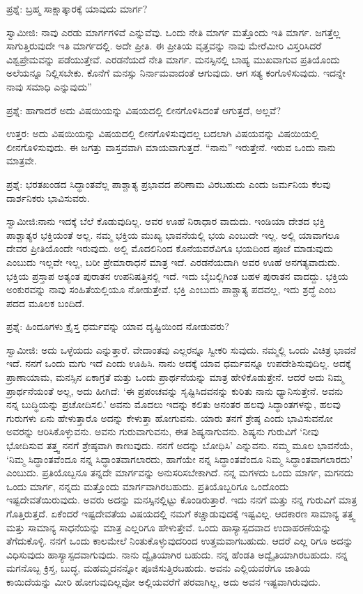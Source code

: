 ಪ್ರಶ್ನೆ: ಬ್ರಹ್ಮ ಸಾಕ್ಷಾತ್ಕಾರಕ್ಕೆ ಯಾವುದು ಮಾರ್ಗ?

ಸ್ವಾಮೀಜಿ: ನಾವು ಎರಡು ಮಾರ್ಗಗಳಿವೆ ಎನ್ನುವೆವು. ಒಂದು ನೇತಿ ಮಾರ್ಗ ಮತ್ತೊಂದು ಇತಿ ಮಾರ್ಗ. ಜಗತ್ತೆಲ್ಲ ಸಾಗುತ್ತಿರುವುದೇ ಇತಿ ಮಾರ್ಗದಲ್ಲಿ. ಅದೇ ಪ್ರೀತಿ. ಈ ಪ್ರೀತಿಯ ವೃತ್ತವನ್ನು ನಾವು ಮೇರೆಮೀರಿ ವಿಸ್ತರಿಸಿದರೆ ವಿಶ್ವಪ್ರೇಮವನ್ನು ಪಡೆಯುತ್ತೇವೆ. ಎರಡನೆಯದೆ ನೇತಿ ಮಾರ್ಗ. ಮನಸ್ಸಿನಲ್ಲಿ ಬಾಹ್ಯ ಮುಖವಾಗುವ ಪ್ರತಿಯೊಂದು ಅಲೆಯನ್ನೂ ನಿಲ್ಲಿಸಬೇಕು. ಕೊನೆಗೆ ಮನಸ್ಸು ನಿರ್ನಾಮವಾದಂತೆ ಆಗುವುದು. ಆಗ ಸತ್ಯ ಕಂಗೊಳಿಸುವುದು. ಇದನ್ನೇ ನಾವು ಸಮಾಧಿ ಎನ್ನುವುದು”

ಪ್ರಶ್ನೆ: ಹಾಗಾದರೆ ಅದು ವಿಷಯಿಯನ್ನು ವಿಷಯದಲ್ಲಿ ಲೀನಗೊಳಿಸಿದಂತೆ ಆಗುತ್ತದೆ, ಅಲ್ಲವೆ?

ಉತ್ತರ: ಅದು ವಿಷಯಿಯನ್ನು ವಿಷಯದಲ್ಲಿ ಲೀನಗೊಳಿಸುವುದಲ್ಲ ಬದಲಾಗಿ ವಿಷಯವನ್ನು ವಿಷಯಿಯಲ್ಲಿ ಲೀನಗೊಳಿಸುವುದು. ಈ ಜಗತ್ತು ವಾಸ್ತವವಾಗಿ ಮಾಯವಾಗುತ್ತದೆ. “ನಾನು” ಇರುತ್ತೇನೆ. ಇರುವ ಒಂದು ನಾನು ಮಾತ್ರವೇ.

ಪ್ರಶ್ನೆ: ಭರತಖಂಡದ ಸಿದ್ಧಾಂತವೆಲ್ಲ ಪಾಶ್ಚಾತ್ಯ ಪ್ರಭಾವದ ಪರಿಣಾಮ ವಿರಬಹುದು ಎಂದು ಜರ್ಮನಿಯ ಕೆಲವು ದಾರ್ಶನಿಕರು ಭಾವಿಸುವರು.

ಸ್ವಾಮೀಜಿ:ನಾನು ಇದಕ್ಕೆ ಬೆಲೆ ಕೊಡುವುದಿಲ್ಲ. ಅವರ ಊಹೆ ನಿರಾಧಾರ ವಾದುದು. ಇಂಡಿಯಾ ದೇಶದ ಭಕ್ತಿ ಪಾಶ್ಚಾತ್ಯರ ಭಕ್ತಿಯಂತೆ ಅಲ್ಲ. ನಮ್ಮ ಭಕ್ತಿಯ ಮುಖ್ಯ ಭಾವನೆಯಲ್ಲಿ ಭಯ ಎಂಬುದೇ ಇಲ್ಲ. ಅಲ್ಲಿ ಯಾವಾಗಲೂ ದೇವರ ಪ್ರೀತಿಯೊಂದೇ ಇರುವುದು. ಅಲ್ಲಿ ಮೊದಲಿನಿಂದ ಕೊನೆಯವರೆವಿಗೂ ಭಯದಿಂದ ಪೂಜೆ ಮಾಡುವುದು ಎಂಬುದು ಇಲ್ಲವೇ ಇಲ್ಲ, ಬರೀ ಪ್ರೇಮಾರಾಧನೆ ಮಾತ್ರ ಇದೆ. ಎರಡನೆಯದಾಗಿ ಅವರ ಊಹೆ ಅನಗತ್ಯವಾದುದು. ಭಕ್ತಿಯ ಪ್ರಸ್ತಾಪ ಅತ್ಯಂತ ಪುರಾತನ ಉಪನಿಷತ್ತಿನಲ್ಲಿ ಇದೆ. ಇದು ಬೈಬಲ್ಲಿಗಿಂತ ಬಹಳ ಪುರಾತನ ವಾದದ್ದು. ಭಕ್ತಿಯ ಅಂಕುರವನ್ನು ನಾವು ಸಂಹಿತೆಯಲ್ಲಿಯೂ ನೋಡುತ್ತೇವೆ. ಭಕ್ತಿ ಎಂಬುದು ಪಾಶ್ಚಾತ್ಯ ಪದವಲ್ಲ, ಇದು ಶ್ರದ್ಧೆ ಎಂಬ ಪದದ ಮೂಲಕ ಬಂದಿದೆ.

ಪ್ರಶ್ನೆ: ಹಿಂದೂಗಳು ಕ್ರೈಸ್ತ ಧರ್ಮವನ್ನು ಯಾವ ದೃಷ್ಟಿಯಿಂದ ನೋಡುವರು?

ಸ್ವಾಮೀಜಿ: ಅದು ಒಳ್ಳೆಯದು ಎನ್ನುತ್ತಾರೆ. ವೇದಾಂತವು ಎಲ್ಲರನ್ನೂ ಸ್ವೀಕರಿ ಸುವುದು. ನಮ್ಮಲ್ಲಿ ಒಂದು ವಿಚಿತ್ರ ಭಾವನೆ ಇದೆ. ನನಗೆ ಒಂದು ಮಗು ಇದೆ ಎಂದು ಊಹಿಸಿ. ನಾನು ಅದಕ್ಕೆ ಯಾವ ಧರ್ಮವನ್ನೂ ಉಪದೇಶಿಸುವುದಿಲ್ಲ. ಅದಕ್ಕೆ ಪ್ರಾಣಾಯಾಮ, ಮನಸ್ಸಿನ ಏಕಾಗ್ರತೆ ಮತ್ತು ಒಂದು ಪ್ರಾರ್ಥನೆಯನ್ನು ಮಾತ್ರ ಹೇಳಿಕೊಡುತ್ತೇನೆ. ಆದರೆ ಅದು ನಿಮ್ಮ ಪ್ರಾರ್ಥನೆಯಂತೆ ಅಲ್ಲ, ಅದು ಹೀಗಿದೆ: ‘ಈ ಪ್ರಪಂಚವನ್ನು ಸೃಷ್ಟಿಸಿದವನನ್ನು ಕುರಿತು ನಾನು ಧ್ಯಾನಿಸುತ್ತೇನೆ. ಅವನು ನನ್ನ ಬುದ್ಧಿಯನ್ನು ಪ್ರಚೋದಿಸಲಿ.’ ಅವನು ಮೊದಲು ಇದನ್ನು ಕಲಿತು ಅನಂತರ ಹಲವು ಸಿದ್ಧಾಂತಗಳನ್ನು, ಹಲವು ಗುರುಗಳು ಏನು ಹೇಳುತ್ತಾರೊ ಅದನ್ನು ಕೇಳುತ್ತಾ ಹೋಗುವನು. ಯಾರು ತನಗೆ ಶ್ರೇಷ್ಠ ಎಂದು ಭಾವಿಸುವನೋ ಅವರನ್ನು ಆರಿಸಿಕೊಳ್ಳುವನು. ಅವನು ಗುರುವಾಗುವನು, ಈತ ಶಿಷ್ಯನಾಗುವನು. ಶಿಷ್ಯನು ಗುರುವಿಗೆ ‘ನೀವು ಭೋದಿಸುವ ತತ್ತ್ವ ನನಗೆ ಶ್ರೇಷ್ಠವಾಗಿ ಕಾಣುವುದು. ನನಗೆ ಅದನ್ನು ಬೋಧಿಸಿ’ ಎನ್ನುವನು. ನಮ್ಮ ಮೂಲ ಭಾವನೆಯೆ, ‘ನಿಮ್ಮ ಸಿದ್ಧಾಂತವೆಂದೂ ನನ್ನ ಸಿದ್ಧಾಂತವಾಗಲಾರದು, ಹಾಗೆಯೇ ನನ್ನ ಸಿದ್ಧಾಂತವೆಂದೂ ನಿಮ್ಮ ಸಿದ್ಧಾಂತವಾಗಲಾರದು’ ಎಂಬುದು. ಪ್ರತಿಯೊಬ್ಬನೂ ತನ್ನದೇ ಮಾರ್ಗವನ್ನು ಅನುಸರಿಸಬೇಕಾಗಿದೆ. ನನ್ನ ಮಗಳದು ಒಂದು ಮಾರ್ಗ, ಮಗನದು ಒಂದು ಮಾರ್ಗ, ನನ್ನದು ಮತ್ತೊಂದು ಮಾರ್ಗವಾಗಿರಬಹುದು. ಪ್ರತಿಯೊಬ್ಬರಿಗೂ ಒಂದೊಂದು ಇಷ್ಟದೇವತೆಯಿರುವುದು. ಅವರು ಅದನ್ನು ಮನಸ್ಸಿನಲ್ಲಿಟ್ಟು ಕೊಂಡಿರುತ್ತಾರೆ. ಇದು ನನಗೆ ಮತ್ತು ನನ್ನ ಗುರುವಿಗೆ ಮಾತ್ರ ಗೊತ್ತಿರುತ್ತದೆ. ಏಕೆಂದರೆ ಇಷ್ಟದೇವತೆಯ ವಿಷಯದಲ್ಲಿ ನಮಗೆ ಕಚ್ಚಾಡುವುದಕ್ಕೆ ಇಷ್ಟವಿಲ್ಲ. ಆದಕಾರಣ ಸಾಮಾನ್ಯ ತತ್ತ್ವ ಮತ್ತು ಸಾಮಾನ್ಯ ಸಾಧನೆಯನ್ನು ಮಾತ್ರ ಎಲ್ಲರಿಗೂ ಹೇಳುತ್ತೇವೆ. ಒಂದು ಹಾಸ್ಯಾಸ್ಪದವಾದ ಉದಾಹರಣೆಯನ್ನು ತೆಗೆದುಕೊಳ್ಳಿ. ನನಗೆ ಒಂದು ಕಾಲಮೇಲೆ ನಿಂತುಕೊಳ್ಳುವುದರಿಂದ ಉತ್ತಮವಾಗಬಹುದು. ಆದರೆ ಎಲ್ಲ ರಿಗೂ ಅದನ್ನು ವಿಧಿಸುವುದು ಹಾಸ್ಯಾಸ್ಪದವಾಗುವುದು. ನಾನು ದ್ವೈತಿಯಾಗಿರ ಬಹುದು. ನನ್ನ ಹೆಂಡತಿ ಅದ್ವೈತಿಯಾಗಿರಬಹುದು. ನನ್ನ ಮಗನೊಬ್ಬ ಕ್ರಿಸ್ತ, ಬುದ್ಧ, ಮಹಮ್ಮದನನ್ನೋ ಪೂಜಿಸುತ್ತಿರಬಹುದು. ಅವನು ಎಲ್ಲಿಯವರೆಗೂ ಜಾತಿಯ ಕಾಯಿದೆಯನ್ನು ಮೀರಿ ಹೋಗುವುದಿಲ್ಲವೋ ಅಲ್ಲಿಯವರೆಗೆ ಪರವಾಗಿಲ್ಲ, ಅದು ಅವನ ಇಷ್ಟವಾಗಿರುವುದು.

